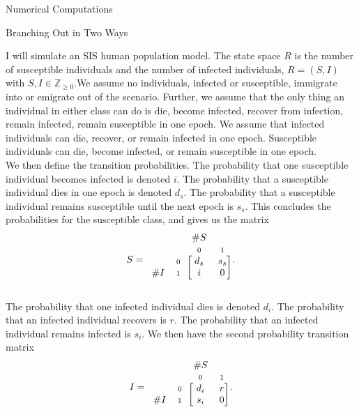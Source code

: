 \documentclass[12pt]{article}
\newcommand{\matindex}[1]{\mbox{\scriptsize#1}}
\numberwithin{equation}{section}
\begin{document}
\begin{section}{Numerical Computations}
\begin{subsection}{Branching Out in Two Ways}
\begin{enumerate}
        I will simulate an SIS human population model. The state space $R$ is the number of susceptible individuals and the number of infected individuals, $R=(S,I)$ with $S,I\in\mathbb{Z}_{\geq 0}$.We assume no individuals, infected or susceptible, immigrate into or emigrate out of the scenario. Further, we assume that the only thing an individual in either class can do is die, become infected, recover from infection, remain infected, remain susceptible in one epoch. We assume that infected individuals can die, recover, or remain infected in one epoch. Susceptible individuals can die, become infected, or remain susceptible in one epoch. \\
        We then define the transition probabilities. The probability that one susceptible individual becomes infected is denoted $i$. The probability that a susceptible individual dies in one epoch is denoted $d_s$. The probability that a susceptible individual remains susceptible until the next epoch is $s_s$. This concludes the probabilities for the susceptible class, and gives us the matrix
        $$S=\begin{blockarray}{cccc}
        &&\#S&\\
        &&\matindex{0}&\matindex{1}\\
        \begin{block}{cc[cc]}
        &\matindex{0}&d_s&s_s\\
        \#I&\matindex{1}&i&0\\
        \end{block}
        \end{blockarray}.$$

        The probability that one infected individual dies is denoted $d_i$. The probability that an infected individual recovers is $r$. The probability that an infected individual remains infected is $s_i$. We then have the second probability transition matrix
        $$I=\begin{blockarray}{cccc}
        &&\#S&\\
        &&\matindex{0}&\matindex{1}\\
        \begin{block}{cc[cc]}
        &\matindex{0}&d_i&r\\
        \#I&\matindex{1}&s_i&0\\
        \end{block}
        \end{blockarray}.$$


\end{enumerate}
\end{subsection}
\end{section}
\end{document}
